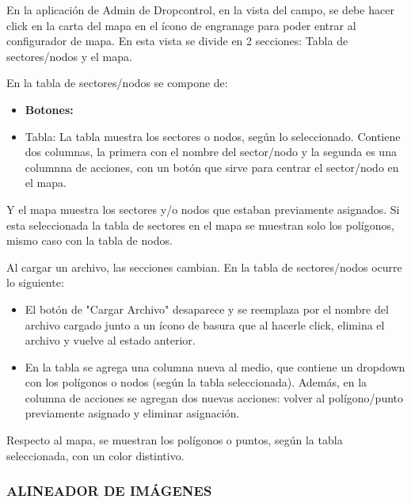 En la aplicación de Admin de Dropcontrol, en la vista del campo, se debe hacer click en la carta del mapa en el ícono de engranage para poder entrar al configurador de mapa.
En esta vista se divide en 2 secciones: Tabla de sectores/nodos y el mapa.

En la tabla de sectores/nodos se compone de:

\begin{itemize}
    \item \textbf{Botones:}
    \item Tabla: La tabla muestra los sectores o nodos, según lo seleccionado. Contiene dos columnas, la primera con el nombre del sector/nodo y la segunda es una columnna de acciones, con un botón que sirve para centrar el sector/nodo en el mapa.
\end{itemize}

Y el mapa muestra los sectores y/o nodos que estaban previamente asignados. Si esta seleccionada la tabla de sectores en el mapa se muestran solo los polígonos, mismo caso con la tabla de nodos.

Al cargar un archivo, las secciones cambian. En la tabla de sectores/nodos ocurre lo siguiente:

\begin{itemize}
    \item El botón de "Cargar Archivo" desaparece y se reemplaza por el nombre del archivo cargado junto a un ícono de basura que al hacerle click, elimina el archivo y vuelve al estado anterior.
    \item En la tabla se agrega una columna nueva al medio, que contiene un dropdown con los polígonos o nodos (según la tabla seleccionada). Además, en la columna de acciones se agregan dos nuevas acciones: volver al polígono/punto previamente asignado y eliminar asignación. 
\end{itemize}

Respecto al mapa, se muestran los polígonos o puntos, según la tabla seleccionada, con un color distintivo.

\subsubsection{ALINEADOR DE IMÁGENES}

